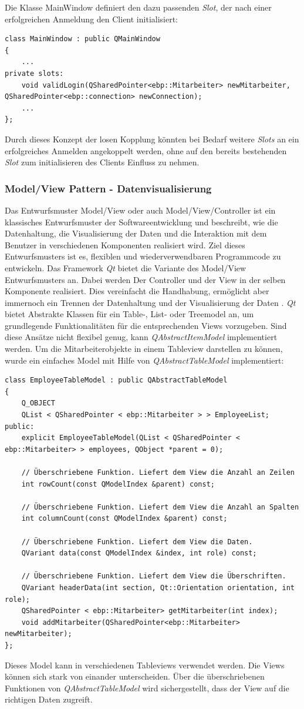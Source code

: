 Die Klasse MainWindow definiert den dazu passenden \textit{Slot}, der nach einer erfolgreichen Anmeldung den Client initialisiert:
\begin{lstlisting}
class MainWindow : public QMainWindow
{
    ...
private slots:
    void validLogin(QSharedPointer<ebp::Mitarbeiter> newMitarbeiter, QSharedPointer<ebp::connection> newConnection);
    ...
};
\end{lstlisting}
Durch dieses Konzept der losen Kopplung könnten bei Bedarf weitere \textit{Slots} an ein erfolgreiches Anmelden angekoppelt werden, ohne auf den bereits bestehenden \textit{Slot} zum initialisieren des Clients Einfluss zu nehmen.
\subsubsection{Model/View Pattern - Datenvisualisierung}
Das Entwurfsmuster Model/View oder auch Model/View/Controller ist ein klassisches Entwurfsmuster der Softwareentwicklung und beschreibt, wie die Datenhaltung, die Visualisierung der Daten und die Interaktion mit dem Benutzer in verschiedenen Komponenten realisiert wird. Ziel dieses Entwurfsmusters ist es, flexiblen und wiederverwendbaren Programmcode zu entwickeln.
Das Framework \textit{Qt} bietet die Variante des Model/View Entwurfsmusters an. Dabei werden Der Controller und der View in der selben Komponente realisiert. Dies vereinfacht die Handhabung, ermöglicht aber immernoch ein Trennen der Datenhaltung und der Visualisierung der Daten \cite[Vgl.]{QtModelView}.
\textit{Qt} bietet Abstrakte Klassen für ein Table-, List- oder Treemodel an, um grundlegende Funktionalitäten für die entsprechenden Views vorzugeben. Sind diese Ansätze nicht flexibel genug, kann \textit{QAbstractItemModel} implementiert werden. Um die Mitarbeiterobjekte in einem Tableview darstellen zu können, wurde ein einfaches Model mit Hilfe von \textit{QAbstractTableModel} implementiert:
\newpage
\begin{lstlisting}
class EmployeeTableModel : public QAbstractTableModel
{
    Q_OBJECT
    QList < QSharedPointer < ebp::Mitarbeiter > > EmployeeList;
public:
    explicit EmployeeTableModel(QList < QSharedPointer < ebp::Mitarbeiter> > employees, QObject *parent = 0);
    
    // Überschriebene Funktion. Liefert dem View die Anzahl an Zeilen    
    int rowCount(const QModelIndex &parent) const;

    // Überschriebene Funktion. Liefert dem View die Anzahl an Spalten
    int columnCount(const QModelIndex &parent) const;

    // Überschriebene Funktion. Liefert dem View die Daten.
    QVariant data(const QModelIndex &index, int role) const;

    // Überschriebene Funktion. Liefert dem View die Überschriften.
    QVariant headerData(int section, Qt::Orientation orientation, int role);
    QSharedPointer < ebp::Mitarbeiter> getMitarbeiter(int index);
    void addMitarbeiter(QSharedPointer<ebp::Mitarbeiter> newMitarbeiter);
};
\end{lstlisting}
Dieses Model kann in verschiedenen Tableviews verwendet werden. Die Views können sich stark von einander unterscheiden. Über die überschriebenen Funktionen von \textit{QAbstractTableModel} wird sichergestellt, dass der View auf die richtigen Daten zugreift.
\newpage
